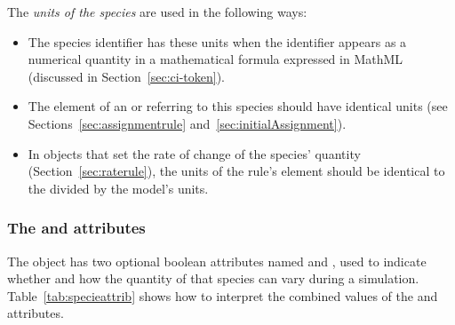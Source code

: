 The \emph{units of the species} are used in the following ways:
\begin{itemize}

\item The species identifier has these units when the
    identifier appears as a numerical quantity in a mathematical
  formula expressed in MathML (discussed in
  Section~\ref{sec:ci-token}).

\item The  element of an \AssignmentRule or
  \InitialAssignment referring to this species should have identical
  units (see Sections~\ref{sec:assignmentrule}
  and~\ref{sec:initialAssignment}).

\item In \RateRule objects that set the rate of change of the
  species' quantity (Section~\ref{sec:raterule}), the units of the
  rule's  element should be identical to the
   divided by the model's
   units.

\end{itemize}


\subsubsection{The  and  attributes}
\label{sec:species-constant}

The \Species object has two optional boolean attributes named
 and , used to indicate
whether and how the quantity of that species can vary during a
simulation.  Table~\ref{tab:specieattrib} shows how to interpret
the combined values of the  and
 attributes.

